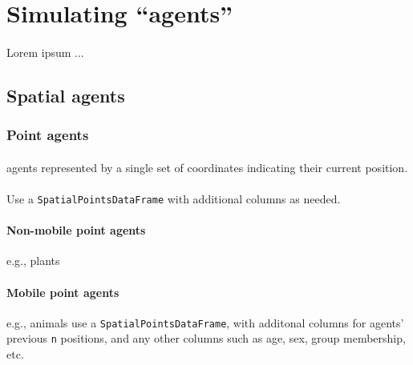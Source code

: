 \documentclass{article}
\begin{document}
\newpage

\section{Simulating ``agents''}

\paragraph{}
Lorem ipsum ...

\subsection{Spatial agents}

\subsubsection{Point agents}

\paragraph{}
agents represented by a single set of coordinates indicating their current position.

\paragraph{}
Use a \texttt{SpatialPointsDataFrame} with additional columns as needed.

\paragraph{Non-mobile point agents}
e.g., plants

\paragraph{Mobile point agents}
e.g., animals use a \texttt{SpatialPointsDataFrame}, with additonal columns for agents' previous \texttt{n} positions, and any other columns such as age, sex, group membership, etc.
\end{document}
